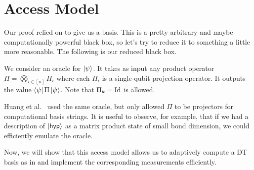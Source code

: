 \newcommand{\ketbb}{\ket{\smash{b^\bot}}}
\newcommand{\tpO}{\smash{\widetilde{\smash{\psi}}^0}}
\newcommand{\ktpO}
{\ket{\tpO}}
\newcommand{\tpI}{\smash{\widetilde{\smash{\psi}}^1}}
\newcommand{\ktpI}
{\ket{\tpI}}
\newcommand{\tfO}{\smash{\widetilde{\phi}^0}}
\newcommand{\ktfO}
{\ket{\tfO}}
\newcommand{\tfI}{\smash{\widetilde{\phi}^1}}
\newcommand{\ktfI}
{\ket{\tfI}}
\newcommand{\psip}{\smash{\psi'}}
\newcommand{\phip}{\smash{\phi'}}
\newcommand{\tarp}{\smash{\overline{\tar}}}
\newcommand{\labp}{\smash{\overline{\lab}}}
\newcommand{\tarz}{\smash{\tar^{0}}}
\newcommand{\taro}{\smash{\tar^{1}}}
\newcommand{\labz}{\smash{\lab^{0}}}
\newcommand{\labo}{\smash{\lab^{1}}}

\section{Access Model} %
Our proof relied on  to give us a basis. This is a pretty arbitrary and maybe computationally powerful black box, so let's try to reduce it to something a little more reasonable. The following is our reduced black box.

\begin{definition}\label{def:access model}
We consider an oracle for $\ket{\psi}$. It takes as input any product operator $\Pi=\bigotimes_{i \in [n]} \Pi_i$ where each $\Pi_i$ is a single-qubit projection operator. It outputs the value $\bra{\psi} \Pi \ket{\psi}$. Note that $\Pi_k=\mathrm{Id}$ is allowed.
\end{definition}
Huang et al.~\cite{huang2024certifying} used the same oracle, but only allowed $\Pi$ to be projectors for computational basis strings. It is useful to observe, for example, that if we had a description of $\ket{\mathsf{hyp}}$ as a matrix product state of small bond dimension, we could efficiently emulate the oracle.

Now, we will show that this access model allows us to adaptively compute a DT basis as in  and implement the corresponding measurements efficiently.


